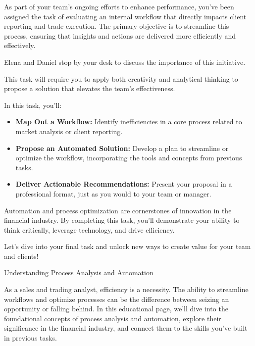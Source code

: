 \documentclass[11pt]{article}
\begin{document}
As part of your team's ongoing efforts to enhance performance, you've been
assigned the task of evaluating an internal workflow that directly impacts
client reporting and trade execution. The primary objective is to streamline
this process, ensuring that insights and actions are delivered more
efficiently and effectively.

Elena and Daniel stop by your desk to discuss the importance of this
initiative.



This task will require you to apply both creativity and analytical thinking to
propose a solution that elevates the team's effectiveness.

In this task, you'll:
\begin{itemize}[leftmargin=1.5em, itemsep=2pt]
  \item \textbf{Map Out a Workflow:} Identify inefficiencies in a core process
  related to market analysis or client reporting.
  \item \textbf{Propose an Automated Solution:} Develop a plan to streamline or
  optimize the workflow, incorporating the tools and concepts from previous
  tasks.
  \item \textbf{Deliver Actionable Recommendations:} Present your proposal in a
  professional format, just as you would to your team or manager.
\end{itemize}

Automation and process optimization are cornerstones of innovation in the
financial industry. By completing this task, you'll demonstrate your ability
to think critically, leverage technology, and drive efficiency.

Let's dive into your final task and unlock new ways to create value for your
team and clients!

\newpage
{\fontsize{26}{30}\selectfont Understanding Process Analysis and Automation}\par\bigskip

As a sales and trading analyst, efficiency is a necessity. The ability to
streamline workflows and optimize processes can be the difference between
seizing an opportunity or falling behind. In this educational page, we'll dive
into the foundational concepts of process analysis and automation, explore
their significance in the financial industry, and connect them to the skills
you've built in previous tasks.
\end{document}
